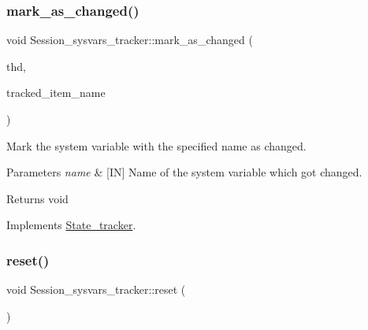 \mbox{\label{classSession__sysvars__tracker_adeca89d5fa8be0279ec522c7afd8fcae}} 
\subsubsection{\texorpdfstring{mark\+\_\+as\+\_\+changed()}{mark\_as\_changed()}}
{\footnotesize\ttfamily void Session\+\_\+sysvars\+\_\+tracker\+::mark\+\_\+as\+\_\+changed (\begin{DoxyParamCaption}\item[{T\+HD $\ast$}]{thd,  }\item[{L\+E\+X\+\_\+\+C\+S\+T\+R\+I\+NG $\ast$}]{tracked\+\_\+item\+\_\+name }\end{DoxyParamCaption})\hspace{0.3cm}{\ttfamily [virtual]}}



Mark the system variable with the specified name as changed. 


\begin{DoxyParams}{Parameters}
{\em name} & \mbox{[}IN\mbox{]} Name of the system variable which got changed.\\
\hline
\end{DoxyParams}
\begin{DoxyReturn}{Returns}
void 
\end{DoxyReturn}


Implements \mbox{\hyperlink{classState__tracker_afb865d3837c0f8fc9cd36d5234142b32}{State\+\_\+tracker}}.

\mbox{\label{classSession__sysvars__tracker_a1b134fe57695e59ddef1d20ab2044036}} 
\subsubsection{\texorpdfstring{reset()}{reset()}}
{\footnotesize\ttfamily void Session\+\_\+sysvars\+\_\+tracker\+::reset (\begin{DoxyParamCaption}\item[{void}]{ }\end{DoxyParamCaption})}




